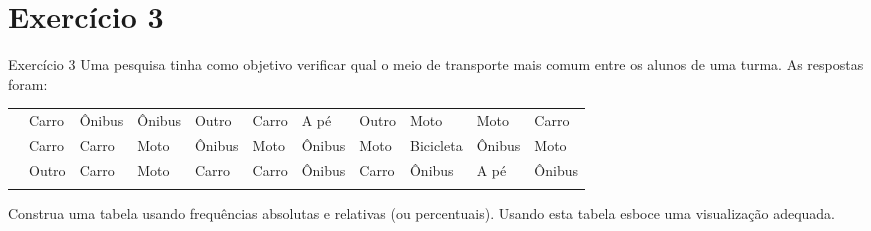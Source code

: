 \documentclass[
  ignorenonframetext,
  serif,
  professionalfont,
  usenames,
  dvipsnames,
  aspectratio = 169]{beamer}
\begin{document}
\section{Exercício 3}\label{exercuxedcio-3}

\begin{frame}{Exercício 3}
\label{exercuxedcio-3-1}
Uma pesquisa tinha como objetivo verificar qual o meio de transporte
mais comum entre os alunos de uma turma. As respostas foram:

\begin{longtable}[]{@{}
  >{\raggedright\arraybackslash}p{}
  >{\raggedright\arraybackslash}p{}
  >{\raggedright\arraybackslash}p{}
  >{\raggedright\arraybackslash}p{}
  >{\raggedright\arraybackslash}p{}
  >{\raggedright\arraybackslash}p{}
  >{\raggedright\arraybackslash}p{}
  >{\raggedright\arraybackslash}p{}
  >{\raggedright\arraybackslash}p{}
  >{\raggedright\arraybackslash}p{}
  >{\raggedright\arraybackslash}p{}@{}}
\toprule\noalign{}
\endhead
& Carro & Ônibus & Ônibus & Outro & Carro & A pé & Outro & Moto & Moto &
Carro \\
& Carro & Carro & Moto & Ônibus & Moto & Ônibus & Moto & Bicicleta &
Ônibus & Moto \\
& Outro & Carro & Moto & Carro & Carro & Ônibus & Carro & Ônibus & A pé
& Ônibus \\
\bottomrule\noalign{}
\end{longtable}

Construa uma tabela usando frequências absolutas e relativas (ou
percentuais). Usando esta tabela esboce uma visualização adequada.
\end{frame}
\end{document}
